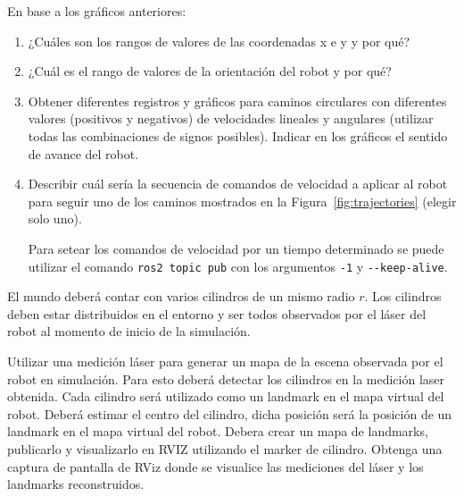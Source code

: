 \documentclass[tp]{lcc}
\begin{document}
	
	En base a los gráficos anteriores:
	
	\begin{enumerate}
		
		\item ¿Cuáles son los rangos de valores de las coordenadas x e y y por qué?
		
		\item  ¿Cuál es el rango de valores de la orientación del robot y por qué?
		
		\item Obtener diferentes registros y gráficos para caminos circulares con diferentes valores (positivos y negativos) de velocidades lineales y angulares (utilizar todas las combinaciones de signos posibles). Indicar en los gráficos el sentido de avance del robot.
		
		\item Describir cuál sería la secuencia de comandos de velocidad a aplicar al robot para seguir uno de los caminos mostrados en la Figura~\ref{fig:trajectories} (elegir solo uno).
		
		\begin{nota}
			Para setear los comandos de velocidad por un tiempo determinado se puede utilizar el comando \lstinline[style=bash]{ros2 topic pub} con los argumentos \lstinline[style=bash]{-1} y \lstinline[style=bash]{--keep-alive}.
		\end{nota}
		
	\end{enumerate}
	

	\ejercicio El mundo deberá contar con varios cilindros de un mismo radio $r$. Los cilindros deben estar distribuidos en el entorno y ser todos observados por el láser del robot al momento de inicio de la simulación.
	
	Utilizar una medición láser para generar un mapa de la escena observada por el robot en simulación. Para esto deberá detectar los cilindros en la medición laser obtenida. Cada cilindro será utilizado como un landmark en el mapa virtual del robot. Deberá estimar el centro del cilindro, dicha posición será la posición de un landmark en el mapa virtual del robot. Debera crear un mapa de landmarks, publicarlo y visualizarlo en RVIZ utilizando el marker de cilindro.
	Obtenga una captura de pantalla de RViz donde se visualice las mediciones del láser y los landmarks reconstruidos.
	
	
	\printbibliography
	
\end{document}
